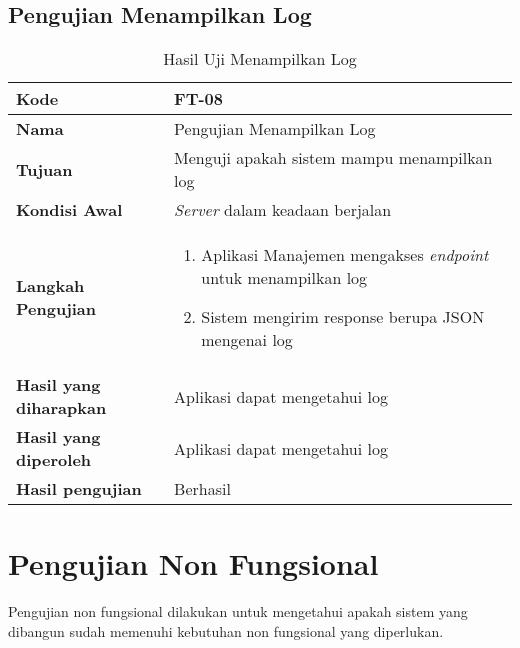 \subsection{Pengujian Menampilkan Log}
\begin{longtable}{|p{3cm}|p{6.5cm}|}
	\caption{Hasil Uji Menampilkan Log} \label{t:uji_menampilkan_log} \\ \hline
	\textbf{Kode} & FT-08 \\ \hline
	\textbf{Nama} & Pengujian Menampilkan Log \\ \hline
	\textbf{Tujuan} & Menguji apakah sistem mampu menampilkan log \\ \hline
	\textbf{Kondisi Awal} &  \textit{Server} dalam keadaan berjalan\\ \hline
	\textbf{Langkah Pengujian} &  
	\begin{enumerate}
		\item Aplikasi Manajemen mengakses \textit{endpoint} untuk menampilkan log
		\item Sistem mengirim response berupa JSON mengenai log
	\end{enumerate} \\ \hline
	\textbf{Hasil yang diharapkan} & Aplikasi dapat mengetahui log \\ \hline
	\textbf{Hasil yang diperoleh} & Aplikasi dapat mengetahui log \\ \hline
	\textbf{Hasil pengujian} & Berhasil \\ \hline
\end{longtable}

\section{Pengujian Non Fungsional}
\par Pengujian non fungsional dilakukan untuk mengetahui apakah sistem yang dibangun sudah memenuhi kebutuhan non fungsional yang diperlukan.

